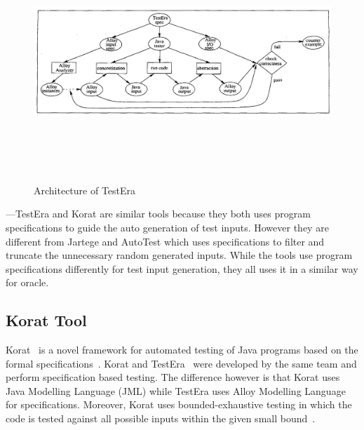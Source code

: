 \begin{figure}[h]
	\centering
	\includegraphics[width=15cm, height=9cm]{chapter3/testera.png}
	\caption{Architecture of TestEra ~\cite{Khurshid2004}}
	\label{fig:testera}
\end{figure}


---TestEra and Korat are similar tools because they both uses program specifications to guide the auto generation of test inputs. However they are different from Jartege and AutoTest which uses specifications to filter and truncate the unnecessary random generated inputs. While the tools use program specifications differently for test input generation, they all uses it in a similar way for oracle. 



\subsection{Korat Tool} %
Korat~\cite{Boyapati2002} is a novel framework for automated testing of Java programs based on the formal specifications~\cite{chang1999structural}. Korat and TestEra~\cite{Khurshid2004} were developed by the same team and perform specification based testing. The difference however is that Korat uses Java Modelling Language (JML) while TestEra uses Alloy Modelling Language for specifications. Moreover, Korat uses bounded-exhaustive testing in which the code is tested against all possible inputs within the given small bound~\cite{khurshid2001checking}.

